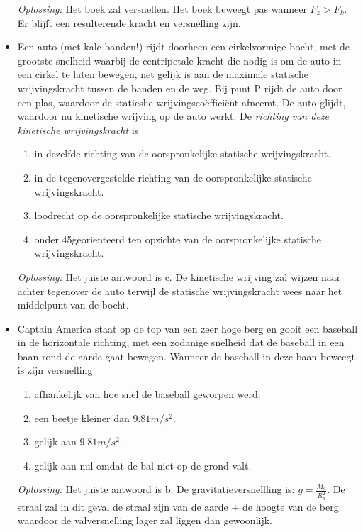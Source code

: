 \documentclass[12pt,a4paper]{article}
\begin{document}
\begin{itemize}
	\textit{Oplossing:} Het boek zal versnellen. Het boek beweegt pas wanneer \(F_z > F_k\). Er blijft een resulterende kracht en versnelling zijn. 
	\newline
	\item Een auto (met kale banden!) rijdt doorheen een cirkelvormige bocht, met de grootste snelheid waarbij de centripetale kracht die nodig is om de auto in een cirkel te laten bewegen, net gelijk is aan de maximale statische wrijvingskracht tussen de banden en de weg. Bij punt P rijdt de auto door een plas, waardoor de staticshe wrijvingscoëfficiënt afneemt. De auto glijdt, waardoor nu kinetische wrijving op de auto werkt. De \textit{richting van deze kinetische wrijvingskracht} is
	\begin{enumerate}[label=\alph*]
		\item in dezelfde richting van de oorspronkelijke statische wrijvingskracht.
		\item in de tegenovergestelde richting van de oorspronkelijke statische wrijvingskracht.
		\item loodrecht op de oorspronkelijke statische wrijvingskracht.
		\item onder 45\degree georienteerd ten opzichte van de oorspronkelijke statische wrijvingskracht.
	\end{enumerate}
	\textit{Oplossing:} Het juiste antwoord is c. De kinetische wrijving zal wijzen naar achter tegenover de auto terwijl de statische wrijvingskracht wees naar het middelpunt van de bocht. 
	\newline
	\item Captain America staat op de top van een zeer hoge berg en gooit een baseball in de horizontale richting, met een zodanige snelheid dat de baseball in een baan rond de aarde gaat bewegen. Wanneer de baseball in deze baan beweegt, is zijn versnelling
	\begin{enumerate}[label=\alph*]
		\item afhankelijk van hoe snel de baseball geworpen werd.
		\item een beetje kleiner dan \(9.81 m/s^2\).
	 	\item gelijk aan \(9.81 m/s^2\).
	 	\item gelijk aan nul omdat de bal niet op de grond valt. 
	\end{enumerate}
	\textit{Oplossing:} Het juiste antwoord is b. De gravitatieversnellling is: \(g = \frac{M_a}{R_a^2}\). De straal zal in dit geval de straal zijn van de aarde + de hoogte van de berg waardoor de valversnelling lager zal liggen dan gewoonlijk. 

\end{itemize}
\end{document}
